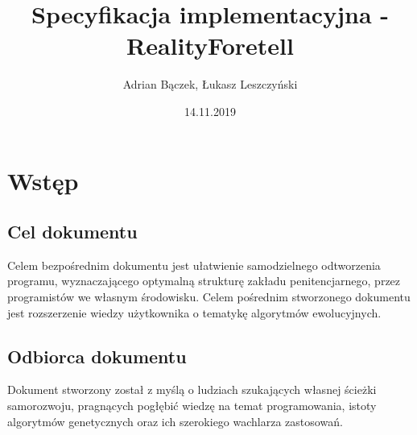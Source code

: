 \documentclass[10pt,oneside]{article}
\title{Specyfikacja implementacyjna - RealityForetell}
\author{Adrian Bączek, Łukasz Leszczyński}
\date{14.11.2019}
\begin{document}
	\maketitle
	
	
	\thispagestyle{fancy}
	
	\newpage
	
	
	\tableofcontents
	
	\newpage
	
	\section{Wstęp}
	\subsection{Cel dokumentu}
	Celem bezpośrednim dokumentu jest ułatwienie samodzielnego odtworzenia programu, wyznaczającego optymalną strukturę zakładu penitencjarnego, przez programistów we własnym środowisku. Celem pośrednim stworzonego dokumentu jest rozszerzenie wiedzy użytkownika o tematykę algorytmów ewolucyjnych.
	\subsection{Odbiorca dokumentu}
	Dokument stworzony został z myślą o ludziach szukających własnej ścieżki samorozwoju, pragnących pogłębić wiedzę na temat programowania, istoty algorytmów genetycznych oraz ich szerokiego wachlarza zastosowań. 
	
\end{document}
